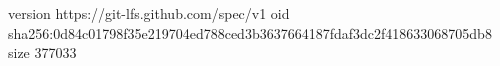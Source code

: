 version https://git-lfs.github.com/spec/v1
oid sha256:0d84c01798f35e219704ed788ced3b3637664187fdaf3dc2f418633068705db8
size 377033

